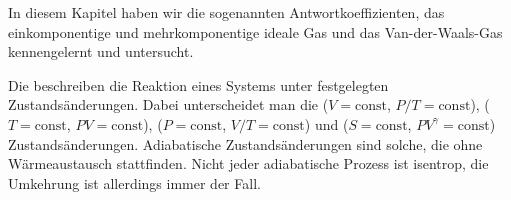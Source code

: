 \begin{summary}
    In diesem Kapitel haben wir die sogenannten Antwortkoeffizienten, das einkomponentige und mehrkomponentige ideale Gas und das Van-der-Waals-Gas kennengelernt und untersucht. 
    
    Die  beschreiben die Reaktion eines Systems unter festgelegten Zustandsänderungen.  Dabei unterscheidet man die  ($V=\text{const}$, $P/T=\text{const}$),  ($T=\text{const}$, $PV=\text{const}$),  ($P=\text{const}$, $V/T=\text{const}$) und  ($S=\text{const}$, $PV^{\gamma}=\text{const}$) Zustandsänderungen. Adiabatische Zustandsänderungen sind solche, die ohne Wärmeaustausch stattfinden. Nicht jeder adiabatische Prozess ist isentrop, die Umkehrung ist allerdings immer der Fall.


\end{summary}
